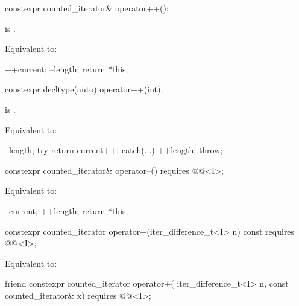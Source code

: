 %
\begin{itemdecl}
constexpr counted_iterator& operator++();
\end{itemdecl}

\begin{itemdescr}
\pnum
\hardexpects
{} is .

\pnum
\effects
Equivalent to:
\begin{codeblock}
++current;
--length;
return *this;
\end{codeblock}
\end{itemdescr}

%
\begin{itemdecl}
constexpr decltype(auto) operator++(int);
\end{itemdecl}

\begin{itemdescr}
\pnum
\hardexpects
{} is .

\pnum
\effects
Equivalent to:
\begin{codeblock}
--length;
try { return current++; }
catch(...) { ++length; throw; }
\end{codeblock}
\end{itemdescr}

%
\begin{itemdecl}
constexpr counted_iterator& operator--()
  requires @@<I>;
\end{itemdecl}

\begin{itemdescr}
\pnum
\effects
Equivalent to:
\begin{codeblock}
--current;
++length;
return *this;
\end{codeblock}
\end{itemdescr}

%
\begin{itemdecl}
constexpr counted_iterator operator+(iter_difference_t<I> n) const
  requires @@<I>;
\end{itemdecl}

\begin{itemdescr}
\pnum
\effects
Equivalent to: 
\end{itemdescr}

%
\begin{itemdecl}
friend constexpr counted_iterator operator+(
  iter_difference_t<I> n, const counted_iterator& x)
    requires @@<I>;
\end{itemdecl}

